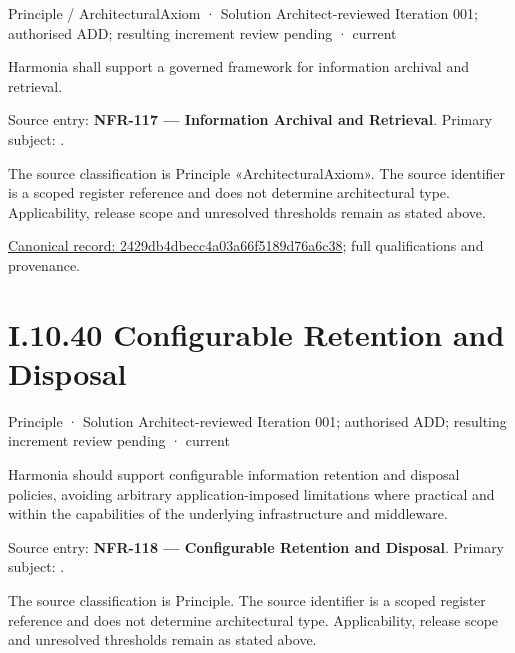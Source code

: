 \label{element:2429db4dbecc4a03a66f5189d76a6c38}
{\small Principle / ArchitecturalAxiom · Solution Architect-reviewed Iteration 001; authorised ADD; resulting increment review pending · current}\par

Harmonia shall support a governed framework for information archival and retrieval.



Source entry: \textbf{NFR-117 — Information Archival and Retrieval}. Primary subject: \texttt{}.



The source classification is Principle «ArchitecturalAxiom». The source identifier is a scoped register reference and does not determine architectural type. Applicability, release scope and unresolved thresholds remain as stated above.


{\footnotesize \href{../../../../../../../continuum/motivation/principle/architectural-axiom/2429db4dbecc4a03a66f5189d76a6c38.md}{Canonical record: 2429db4dbecc4a03a66f5189d76a6c38}; full qualifications and provenance.}\par
\section*{I.10.40 Configurable Retention and Disposal}
\label{navigation:I.10.40}

\label{element:b1a46fce85b4448fba55987af146d61e}
{\small Principle · Solution Architect-reviewed Iteration 001; authorised ADD; resulting increment review pending · current}\par

Harmonia should support configurable information retention and disposal policies, avoiding arbitrary application-imposed limitations where practical and within the capabilities of the underlying infrastructure and middleware.



Source entry: \textbf{NFR-118 — Configurable Retention and Disposal}. Primary subject: \texttt{}.



The source classification is Principle. The source identifier is a scoped register reference and does not determine architectural type. Applicability, release scope and unresolved thresholds remain as stated above.


